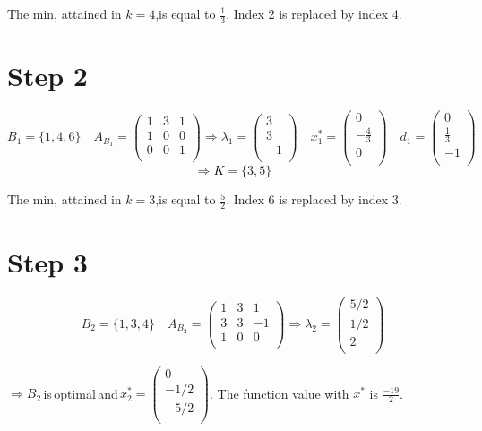 \documentclass[a4paper,11pt,french]{article}
\begin{document}
The min, attained in $k=4$,is equal to $\frac{1}{3}$. Index 2 is replaced by index 4.
   \section{Step 2}
  \begin{displaymath}
  B_1=\{1,4,6\}\quad A_{B_1}=\left(
\begin{array}{ccc}
1 & 3 & 1\\
1 & 0 & 0 \\
0 & 0 & 1\\
\end{array}
\right) \Rightarrow \lambda_1=\left(\begin{array}{c} 3\\ 3\\ -1\\ \end{array}\right)\quad x^*_1=\left(\begin{array}{c} 0\\ -\frac{4}{3}\\ 0\\ \end{array}\right)\quad d_1=\left(\begin{array}{c} 0\\ \frac{1}{3}\\ -1\\ \end{array}\right) \end{displaymath} 
  \begin{displaymath}
    \Rightarrow K=\{3,5\}
  \end{displaymath}
   
  The min, attained in $k=3$,is equal to $\frac{5}{2}$. Index 6 is replaced by index 3.
   
     \section{Step 3}
  \begin{displaymath}
  B_2=\{1,3,4\}\quad A_{B_2}=\left(
\begin{array}{ccc}
1 & 3 & 1\\
3 & 3 & -1 \\
1 & 0 & 0\\
\end{array}
\right) \Rightarrow \lambda_2=\left(\begin{array}{c} 5/2\\ 1/2\\ 2\\ \end{array}\right)
   \end{displaymath}
    
  $\Rightarrow B_2$\,is\,optimal\,and\,$x^*_2=\left(\begin{array}{c}0 \\ -1/2\\ -5/2\\ \end{array}\right)$. The function value with $x^*$ is $\frac{-19}{2}$.
    
\end{document}
